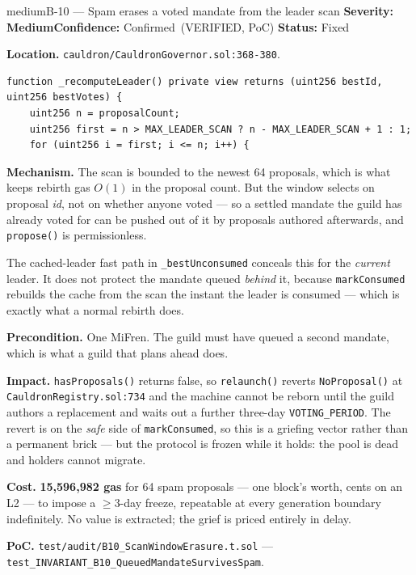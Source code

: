 \documentclass[11pt,a4paper]{article}
\newcommand{\SevMed}{\textcolor{medium}{\textbf{Medium}}}
\newcommand{\Conf}{\textcolor{critical}{Confirmed}}
\newcommand{\Fixed}{\textcolor{good}{Fixed}}
\newcommand{\code}[1]{\texttt{\small #1}}
\newcommand{\fileref}[1]{\texttt{\scriptsize #1}}
\begin{document}
\begin{findingbox}{medium}{B-10 --- Spam erases a voted mandate from the leader scan}
\textbf{Severity:} \SevMed \quad \textbf{Confidence:} \Conf\ (VERIFIED, PoC) \quad
\textbf{Status:} \Fixed

\medskip
\textbf{Location.} \fileref{cauldron/CauldronGovernor.sol:368-380}.

\begin{lstlisting}
function _recomputeLeader() private view returns (uint256 bestId, uint256 bestVotes) {
    uint256 n = proposalCount;
    uint256 first = n > MAX_LEADER_SCAN ? n - MAX_LEADER_SCAN + 1 : 1;
    for (uint256 i = first; i <= n; i++) {
\end{lstlisting}

\textbf{Mechanism.} The scan is bounded to the newest 64 proposals, which is what keeps
rebirth gas $O(1)$ in the proposal count. But the window selects on proposal \emph{id},
not on whether anyone voted --- so a settled mandate the guild has already voted for can be
pushed out of it by proposals authored afterwards, and \code{propose()} is permissionless.

The cached-leader fast path in \code{\_bestUnconsumed} conceals this for the \emph{current}
leader. It does not protect the mandate queued \emph{behind} it, because
\code{markConsumed} rebuilds the cache from the scan the instant the leader is consumed ---
which is exactly what a normal rebirth does.

\textbf{Precondition.} One MiFren. The guild must have queued a second mandate, which is
what a guild that plans ahead does.

\textbf{Impact.} \code{hasProposals()} returns false, so \code{relaunch()} reverts
\code{NoProposal()} at \fileref{CauldronRegistry.sol:734} and the machine cannot be reborn
until the guild authors a replacement and waits out a further three-day
\code{VOTING\_PERIOD}. The revert is on the \emph{safe} side of \code{markConsumed}, so
this is a griefing vector rather than a permanent brick --- but the protocol is frozen
while it holds: the pool is dead and holders cannot migrate.

\textbf{Cost.} \textbf{15{,}596{,}982 gas} for 64 spam proposals --- one block's worth,
cents on an L2 --- to impose a $\geq$3-day freeze, repeatable at every generation boundary
indefinitely. No value is extracted; the grief is priced entirely in delay.

\textbf{PoC.} \fileref{test/audit/B10\_ScanWindowErasure.t.sol} ---
\code{test\_INVARIANT\_B10\_QueuedMandateSurvivesSpam}.
\end{findingbox}
\end{document}
